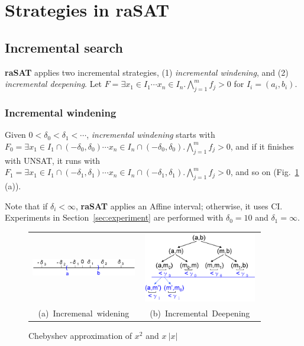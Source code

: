\documentclass[runningheads,a4paper,oribibl]{llncs}
\begin{document}
\section{Strategies in raSAT} \label{sec:strategy}

\subsection{Incremental search} \label{sec:incsearch}

{\bf raSAT} applies two incremental strategies, 
(1) {\em incremental windening}, and (2) {\em incremental deepening}. 
Let
$F = \exists x_1 \in I_1 \cdots x_n \in I_n. \bigwedge \limits_{j=1}^m f_j > 0$
for $I_i = (a_i,b_i)$. %

\subsubsection*{Incremental windening}
Given $0 < \delta_0 < \delta_1 < \cdots$, 
{\em incremental windening} starts with 
$F_0 = \exists x_1 \in I_1 \cap (-\delta_0 , \delta_0) \cdots x_n \in I_n \cap (-\delta_0 , \delta_0). 
\bigwedge \limits_{j=1}^m f_j > 0$, 
and if it finishes with UNSAT, it runs with 
$F_1 = \exists x_1 \in I_1 \cap (-\delta_1 , \delta_1) \cdots x_n \in I_n \cap (-\delta_1 , \delta_1). 
\bigwedge \limits_{j=1}^m f_j > 0$, and so on (Fig.~\ref{fig:incwid} (a)). 

Note that if $\delta_i < \infty$, {\bf raSAT} applies an Affine interval; otherwise, 
it uses CI. 
Experiments in Section~\ref{sec:experiment} are performed 
with $\delta_0 = 10$ and $\delta_1 = \infty$.
\begin{figure}[ht]
\begin{minipage}[b]{1.0\linewidth}
\centering
\begin{tabular}{c@{\qquad}c}
\includegraphics[height=0.4in,width=1.8in]{IncWiden.png} &
\includegraphics[height=1.2in,width=2in]{IncDeepen.png} \\
\mbox{(a) Incremenal widening} & \mbox{(b) Incremental Deepening} \\
\end{tabular}
\caption{Chebyshev approximation of $x^2$ and $x~|x|$}
\label{fig:incwid}
\end{minipage}
\end{figure}
\end{document}
